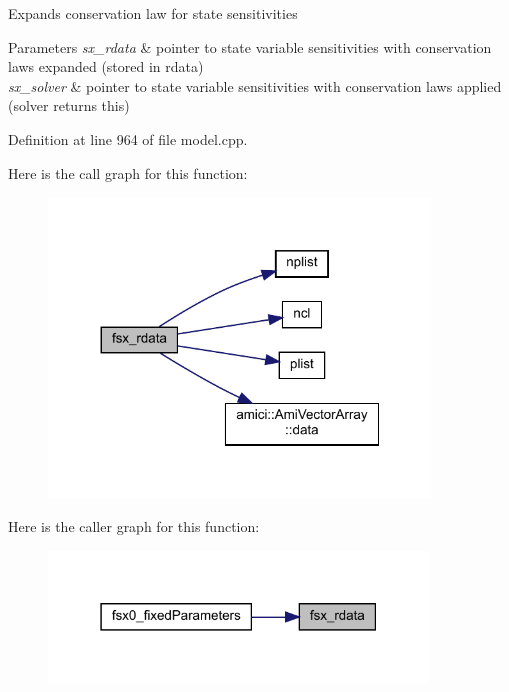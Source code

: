 Expands conservation law for state sensitivities 
\begin{DoxyParams}{Parameters}
{\em sx\+\_\+rdata} & pointer to state variable sensitivities with conservation laws expanded (stored in rdata) \\
\hline
{\em sx\+\_\+solver} & pointer to state variable sensitivities with conservation laws applied (solver returns this) \\
\hline
\end{DoxyParams}


Definition at line 964 of file model.\+cpp.

Here is the call graph for this function\+:
\nopagebreak
\begin{figure}[H]
\begin{center}
\leavevmode
\includegraphics[width=287pt]{classamici_1_1_model_aa19d5feeb75bc472ce6244790ebf765b_cgraph}
\end{center}
\end{figure}
Here is the caller graph for this function\+:
\nopagebreak
\begin{figure}[H]
\begin{center}
\leavevmode
\includegraphics[width=286pt]{classamici_1_1_model_aa19d5feeb75bc472ce6244790ebf765b_icgraph}
\end{center}
\end{figure}
\mbox{\label{classamici_1_1_model_aa9a9e12a414d9ac91249b63d01ab7bca}} 

